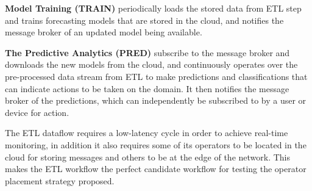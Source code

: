 \textbf{Model Training (TRAIN)} periodically loads the stored data from ETL step and trains forecasting models that are stored in the cloud, and notifies the message broker of an updated model being available. 

\textbf{The Predictive Analytics (PRED)} subscribe to the message broker and downloads the new models from the cloud, and continuously operates over the pre-processed data stream from ETL to make predictions and classifications that can indicate actions to be taken on the domain. It then notifies the message broker of the predictions, which can independently be subscribed to by a user or device for action. 

The ETL dataflow requires a low-latency cycle in order to achieve real-time monitoring, in addition it also requires some of its operators to be located in the cloud for storing messages and others to be at the edge of the network. This makes the ETL workflow the perfect candidate workflow for testing the operator placement strategy proposed. 